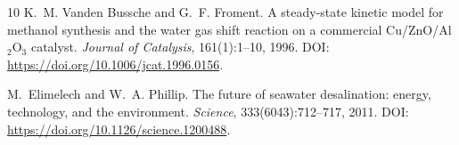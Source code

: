 \documentclass[11pt]{article}
\begin{document}
\begin{thebibliography}{10}
K.~M. Vanden Bussche and G.~F. Froment.
\newblock A steady-state kinetic model for methanol synthesis and the water gas shift reaction on a commercial Cu/ZnO/Al\(_2\)O\(_3\) catalyst.
\newblock \emph{Journal of Catalysis}, 161(1):1--10, 1996.
\newblock DOI: \url{https://doi.org/10.1006/jcat.1996.0156}.

M.~Elimelech and W.~A. Phillip.
\newblock The future of seawater desalination: energy, technology, and the environment.
\newblock \emph{Science}, 333(6043):712--717, 2011.
\newblock DOI: \url{https://doi.org/10.1126/science.1200488}.

\end{thebibliography}
\end{document}

